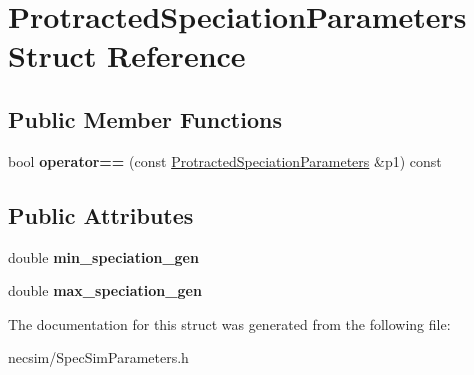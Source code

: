 \hypertarget{struct_protracted_speciation_parameters}{}\section{Protracted\+Speciation\+Parameters Struct Reference}
\label{struct_protracted_speciation_parameters}
\subsection*{Public Member Functions}
\begin{DoxyCompactItemize}
\item 
bool {\bfseries operator==} (const \hyperlink{struct_protracted_speciation_parameters}{Protracted\+Speciation\+Parameters} \&p1) const \hypertarget{struct_protracted_speciation_parameters_abe159fbe34c12a6db9bff5b9fc4edb00}{}\label{struct_protracted_speciation_parameters_abe159fbe34c12a6db9bff5b9fc4edb00}

\end{DoxyCompactItemize}
\subsection*{Public Attributes}
\begin{DoxyCompactItemize}
\item 
double {\bfseries min\+\_\+speciation\+\_\+gen}\hypertarget{struct_protracted_speciation_parameters_a3e2e07443b576ee10b70fc153f772b6c}{}\label{struct_protracted_speciation_parameters_a3e2e07443b576ee10b70fc153f772b6c}

\item 
double {\bfseries max\+\_\+speciation\+\_\+gen}\hypertarget{struct_protracted_speciation_parameters_a79cc8e49ed9a08044718485040ff4346}{}\label{struct_protracted_speciation_parameters_a79cc8e49ed9a08044718485040ff4346}

\end{DoxyCompactItemize}


The documentation for this struct was generated from the following file\+:\begin{DoxyCompactItemize}
\item 
necsim/Spec\+Sim\+Parameters.\+h\end{DoxyCompactItemize}

